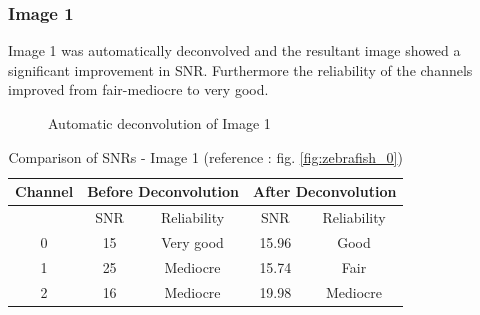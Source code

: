 \documentclass{article}
\begin{document}
\subsubsection*{Image 1}
Image 1 was automatically deconvolved and the resultant image showed a significant improvement in SNR. Furthermore the reliability of the channels improved from fair-mediocre to very good.
\begin{figure}[h!]
\centering
{}
\vspace{5 mm}
\caption{Automatic deconvolution of Image 1}
\label{fig:auto-deconvolve-image1}
\end{figure}
\begin{table}[h!]
\centering
\caption{Comparison of SNRs - Image 1 (reference : fig. \ref{fig:zebrafish_0})}
\begin{tabular}{*5c}
\toprule
Channel &  \multicolumn{2}{c}{Before Deconvolution} & \multicolumn{2}{c}{After Deconvolution}\\
\midrule
{}   & SNR   & Reliability    & SNR   & Reliability \\
0   &  15 & Very good   & 15.96  & Good\\
1   &  25 & Mediocre & 15.74  & Fair\\
2   &  16  &  Mediocre & 19.98  & Mediocre\\
\bottomrule
\end{tabular}
\end{table}
\end{document}
